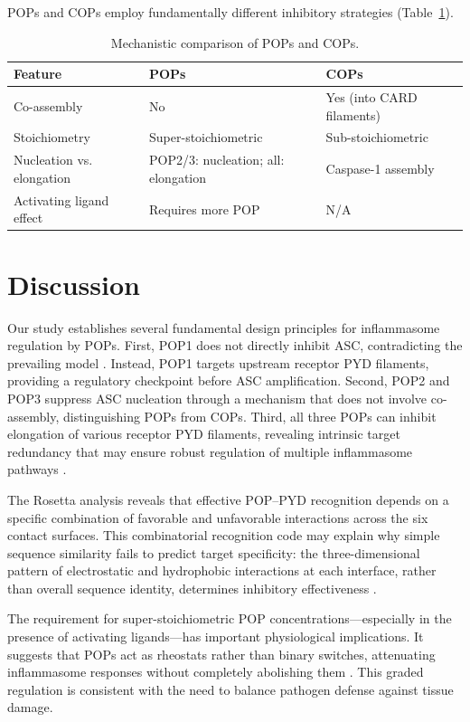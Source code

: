 \documentclass[11pt,a4paper]{article}
\begin{document}
POPs and COPs employ fundamentally different inhibitory strategies (Table~\ref{tab:pop_cop}).

\begin{table}[htbp]
\centering
\caption{Mechanistic comparison of POPs and COPs.}
\label{tab:pop_cop}
\begin{tabular}{lll}
\toprule
\textbf{Feature} & \textbf{POPs} & \textbf{COPs} \\
\midrule
Co-assembly & No & Yes (into CARD filaments) \\
Stoichiometry & Super-stoichiometric & Sub-stoichiometric \\
Nucleation vs. elongation & POP2/3: nucleation; all: elongation & Caspase-1 assembly \\
Activating ligand effect & Requires more POP & N/A \\
\bottomrule
\end{tabular}
\end{table}

\section{Discussion}

Our study establishes several fundamental design principles for inflammasome regulation by POPs. First, POP1 does not directly inhibit ASC, contradicting the prevailing model \citep{Stehlik2003}. Instead, POP1 targets upstream receptor PYD filaments, providing a regulatory checkpoint before ASC amplification. Second, POP2 and POP3 suppress ASC nucleation through a mechanism that does not involve co-assembly, distinguishing POPs from COPs. Third, all three POPs can inhibit elongation of various receptor PYD filaments, revealing intrinsic target redundancy that may ensure robust regulation of multiple inflammasome pathways \citep{Broz2016, Lamkanfi2014}.

The Rosetta analysis reveals that effective POP--PYD recognition depends on a specific combination of favorable and unfavorable interactions across the six contact surfaces. This combinatorial recognition code may explain why simple sequence similarity fails to predict target specificity: the three-dimensional pattern of electrostatic and hydrophobic interactions at each interface, rather than overall sequence identity, determines inhibitory effectiveness \citep{Lu2014, Dick2016}.

The requirement for super-stoichiometric POP concentrations---especially in the presence of activating ligands---has important physiological implications. It suggests that POPs act as rheostats rather than binary switches, attenuating inflammasome responses without completely abolishing them \citep{Rathinam2012, Man2017}. This graded regulation is consistent with the need to balance pathogen defense against tissue damage.
\end{document}
